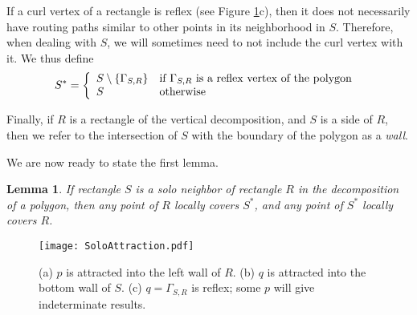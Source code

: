 \documentclass{article}
\newtheorem{lemma}{Lemma}
\newcommand{\curl}[2]{\ensuremath{\Gamma_{#1, #2}}}
\begin{document}
		If a curl vertex of a rectangle is reflex (see Figure \ref{fig:soloattraction}c),
		then it does not necessarily have routing paths similar to other points in
		its neighborhood in $S$.
		Therefore, when dealing with $S$, we will sometimes need to not include the
		curl vertex with it.  We thus define
		\[
			S^* = \left \{ 
					\begin{array}{ll}
						S \setminus \{ \curl{S}{R} \} & 
							\mbox{if \curl{S}{R}\  is a reflex vertex of the polygon } \\
						S & \mbox{otherwise}
					\end{array}
				 \right.
		\]
		
		Finally, if $R$ is a rectangle of the vertical decomposition, and $S$ is a
		side of $R$, then we refer to the intersection of $S$ with the boundary of the polygon as
		a \emph{wall}.
	
	We are now ready to state the first lemma.
	
	\begin{lemma}\label{lem:solocovered}
		If rectangle $S$ is a solo neighbor of rectangle $R$ in the decomposition of
		a polygon, then any point of $R$ locally covers $S^*$, and any point of $S^*$
		locally covers $R$.
	\end{lemma}
	
	\begin{figure}[htbp] 
		\begin{center}
		    \texttt{[image: SoloAttraction.pdf]} 
		\end{center}
		\caption{
			(a) $p$ is attracted into the left wall of $R$.
			(b) $q$ is attracted into the bottom wall of $S$.
			(c) $q = \curl{S}{R}$ is reflex; some $p$ will give indeterminate results.
		}
		\label{fig:soloattraction}
	\end{figure}
	
\end{document}
